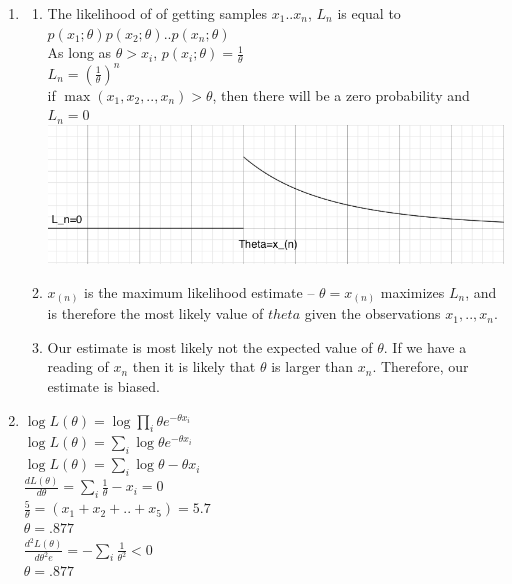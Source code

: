 \documentclass[11pt]{article}
\begin{document}
\begin{enumerate}
\item
\begin{enumerate}
\item
The likelihood of of getting samples $x_1..x_n$, $L_n$ is equal to $p(x_1;\theta)p(x_2;\theta)..p(x_n;\theta)$\\
As long as $\theta > x_i$, $p(x_i;\theta)=\frac{1}{\theta}$\\
$L_n=\left( \frac{1}{\theta} \right)^n$\\
if $\max(x_1,x_2,..,x_n) > \theta$, then there will be a zero probability and $L_n=0$\\
\includegraphics[width=5.5in]{p5_graph.png}
\item
$x_{(n)}$ is the maximum likelihood estimate -- $\theta=x_{(n)}$ maximizes $L_n$, and is therefore the most likely value of $theta$ given the observations $x_1,..,x_n$.
\item
Our estimate is most likely not the expected value of $\theta$. If we have a reading of $x_n$ then it is likely that $\theta$ is larger than $x_n$. Therefore, our estimate is biased.
\end{enumerate}
\item
$\log L(\theta)=\log\prod\limits_{i}\theta e^{-\theta x_i}$\\
$\log L(\theta)=\sum\limits_i \log\theta e^{-\theta x_i}$\\
$\log L(\theta)=\sum\limits_i \log\theta -\theta x_i$\\
$\frac{dL(\theta)}{d\theta}=\sum\limits_i \frac{1}{\theta}-x_i=0$\\
$\frac{5}{\theta}=(x_1+x_2+..+x_5)=5.7$\\
$\theta = .877$\\
$\frac{d^2L(\theta)}{d\theta^2e}= -\sum\limits_i \frac{1}{\theta^2}<0$\\
$\theta = .877$


\end{enumerate}
\end{document}
